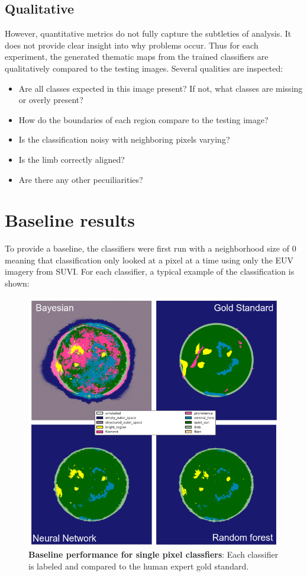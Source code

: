\documentclass[twoside]{report}
\begin{document}
\subsection{Qualitative}
However, quantitative metrics do not fully capture the subtleties of analysis. It does not provide clear insight into why problems occur. Thus for each experiment, the generated thematic maps from the trained classifiers are qualitatively compared to the testing images. Several qualities are inspected:
\begin{itemize}
\item Are all classes expected in this image present? If not, what classes are missing or overly present?
\item How do the boundaries of each region compare to the testing image? 
\item Is the classification noisy with neighboring pixels varying? 
\item Is the limb correctly aligned? 
\item Are there any other pecuiliarities? 
\end{itemize}

\section{Baseline results}
To provide a baseline, the classifiers were first run with a neighborhood size of 0 meaning that classification only looked at a pixel at a time using only the EUV imagery from SUVI. For each classifier, a typical example of the classification is shown:

\begin{figure}[H]
  \begin{center}
    \includegraphics[scale=0.8]{baseline}
    \caption{{\bf Baseline performance for single pixel classfiers}: Each classifier is labeled and compared to the human expert gold standard.}
    \label{fig:baseline}
 \end{center}
\end{figure}
\end{document}
